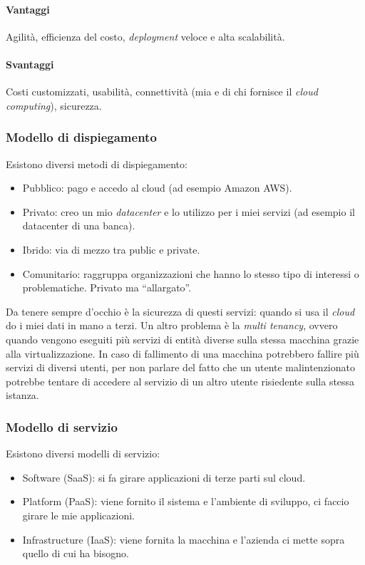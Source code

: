 \paragraph*{Vantaggi} Agilità, efficienza del costo, \textit{deployment} veloce 
e alta scalabilità.

\paragraph*{Svantaggi} Costi customizzati, usabilità, connettività (mia e di 
chi fornisce il \textit{cloud computing}), sicurezza.

\subsubsection{Modello di dispiegamento}

Esistono diversi metodi di dispiegamento:
\begin{itemize}
  \item Pubblico: pago e accedo al cloud (ad esempio Amazon AWS).
  
  \item Privato: creo un mio \textit{datacenter} e lo utilizzo per i miei 
  servizi (ad esempio il datacenter di una banca).
  
  \item Ibrido: via di mezzo tra public e private.
  
  \item Comunitario: raggruppa organizzazioni che hanno lo stesso tipo di 
  interessi o problematiche. Privato ma ``allargato''.
  
\end{itemize}

Da tenere sempre d'occhio è la sicurezza di questi servizi: quando si usa il 
\textit{cloud} do i miei dati in mano a terzi. Un altro problema è la 
\textit{multi tenancy}, ovvero quando vengono eseguiti più servizi di entità 
diverse sulla stessa macchina grazie alla virtualizzazione. In caso di 
fallimento di una macchina potrebbero fallire più servizi di diversi utenti, 
per non parlare del fatto che un utente malintenzionato potrebbe tentare di 
accedere al servizio di un altro utente risiedente sulla stessa istanza.

\subsubsection{Modello di servizio}

Esistono diversi modelli di servizio:
\begin{itemize}
  \item Software (SaaS): si fa girare applicazioni di terze parti sul cloud.
  \item Platform (PaaS): viene fornito il sistema e l'ambiente di sviluppo, ci 
  faccio girare le mie applicazioni. 
  \item Infrastructure (IaaS): viene fornita la macchina e l'azienda ci mette 
  sopra quello di cui ha bisogno.
  
\end{itemize}

